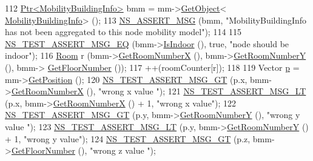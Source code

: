 \begin{DoxyCode}
112       \hyperlink{classns3_1_1Ptr}{Ptr<MobilityBuildingInfo>} bmm = mm->\hyperlink{classns3_1_1Object_a13e18c00017096c8381eb651d5bd0783}{GetObject}<
      \hyperlink{classns3_1_1MobilityBuildingInfo}{MobilityBuildingInfo}> ();
113       \hyperlink{assert_8h_aff5ece9066c74e681e74999856f08539}{NS\_ASSERT\_MSG} (bmm, \textcolor{stringliteral}{"MobilityBuildingInfo has not been aggregated to this node mobility
       model"});
114 
115       \hyperlink{group__testing_ga2a9d78cffb3db8e867c35fff0b698cf5}{NS\_TEST\_ASSERT\_MSG\_EQ} (bmm->\hyperlink{classns3_1_1MobilityBuildingInfo_a2bba20054cc48efcca2d5e0c46f8171c}{IsIndoor} (), \textcolor{keyword}{true}, \textcolor{stringliteral}{"node should be indoor"});
116       \hyperlink{structRoom}{Room} r (bmm->\hyperlink{classns3_1_1MobilityBuildingInfo_ad40faf32d419734e8c86f630e66ab18d}{GetRoomNumberX} (), bmm->\hyperlink{classns3_1_1MobilityBuildingInfo_a5297704859be8e1d3ad22ea3f5f93dbd}{GetRoomNumberY} (), bmm->
      \hyperlink{classns3_1_1MobilityBuildingInfo_aedb2647206f2dae0aa98ec9ac11873c7}{GetFloorNumber} ());
117       ++(roomCounter[r]);
118 
119       Vector \hyperlink{lte__link__budget_8m_ac9de518908a968428863f829398a4e62}{p} = mm->\hyperlink{classns3_1_1MobilityModel_aba838f06ec5bbb2d193d94b8c0e4abb4}{GetPosition} ();
120       \hyperlink{group__testing_ga868cfb773df312b867a506bdd2e3cbef}{NS\_TEST\_ASSERT\_MSG\_GT} (p.x, bmm->\hyperlink{classns3_1_1MobilityBuildingInfo_ad40faf32d419734e8c86f630e66ab18d}{GetRoomNumberX} (), \textcolor{stringliteral}{"wrong x value
      "});
121       \hyperlink{group__testing_ga1d96848b91407c9a0b36583e8b0ad7ae}{NS\_TEST\_ASSERT\_MSG\_LT} (p.x, bmm->\hyperlink{classns3_1_1MobilityBuildingInfo_ad40faf32d419734e8c86f630e66ab18d}{GetRoomNumberX} () + 1, \textcolor{stringliteral}{"wrong x
       value"});
122       \hyperlink{group__testing_ga868cfb773df312b867a506bdd2e3cbef}{NS\_TEST\_ASSERT\_MSG\_GT} (p.y, bmm->\hyperlink{classns3_1_1MobilityBuildingInfo_a5297704859be8e1d3ad22ea3f5f93dbd}{GetRoomNumberY} (), \textcolor{stringliteral}{"wrong y value
      "});
123       \hyperlink{group__testing_ga1d96848b91407c9a0b36583e8b0ad7ae}{NS\_TEST\_ASSERT\_MSG\_LT} (p.y, bmm->\hyperlink{classns3_1_1MobilityBuildingInfo_a5297704859be8e1d3ad22ea3f5f93dbd}{GetRoomNumberY} () + 1, \textcolor{stringliteral}{"wrong y
       value"});
124       \hyperlink{group__testing_ga868cfb773df312b867a506bdd2e3cbef}{NS\_TEST\_ASSERT\_MSG\_GT} (p.z, bmm->\hyperlink{classns3_1_1MobilityBuildingInfo_aedb2647206f2dae0aa98ec9ac11873c7}{GetFloorNumber} (), \textcolor{stringliteral}{"wrong z value
      "});

\end{DoxyCode}
